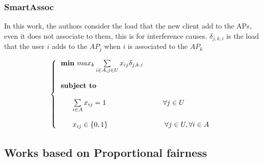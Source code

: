\documentclass[journal,transmag]{IEEEtran}
\begin{document}
\subsubsection{SmartAssoc \cite{13smartAssoc}}
In this work, the authors consider the load that the new client add to the APs, even it does not associate to them, this is for interference causes. $\delta_{j,k,i}$ is the load that the user $i$ adds to the $AP_j$ when $i$ is associated to the $AP_k$

\begin{footnotesize}
\begin{equation}
\left\{
\begin{tabular}{l} 
$\textbf{min $max_k$}  \sum\limits_{i \in A, j \in U} x_{ij} \delta_{j,k,i}$ \\         
\\
\textbf{subject to} \\

\\
~~~~~$ \sum\limits_{i \in A} x_{ij} = 1 $ ~~~~~~~~~~~~~~~~~~~~~~ $\forall j \in U $  \\

\\
~~~~~$ x_{ij} \in \{0,1 \} $ ~~~~~~~~~~~~~~~~~~~~~~ $\forall j \in U,  \forall i \in A $  \\

\end{tabular}
\right.
\end{equation}
\end{footnotesize}

\subsection{Works based on Proportional fairness}
\end{document}

